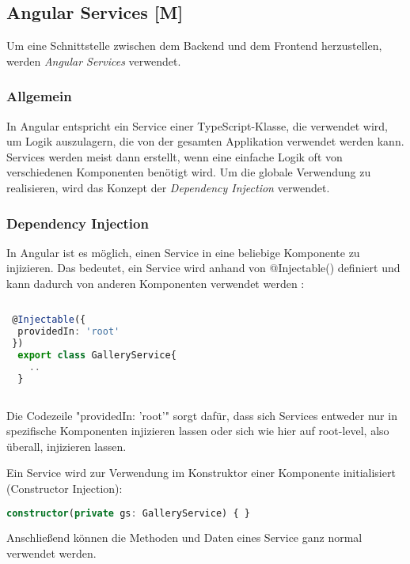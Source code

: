 \subsection{Angular Services [M]}

Um eine Schnittstelle zwischen dem Backend und dem Frontend herzustellen, werden \emph{Angular Services} verwendet.

\subsubsection{Allgemein}
In Angular entspricht ein Service einer TypeScript-Klasse, die verwendet wird, um Logik auszulagern, die von der gesamten Applikation verwendet werden kann. Services werden meist dann erstellt, wenn eine einfache Logik oft von verschiedenen Komponenten benötigt wird. Um die globale Verwendung zu realisieren, wird das Konzept der \emph{Dependency Injection} verwendet. \cite{AngularBuch} \cite{AngularArchitectureService}

\subsubsection{Dependency Injection}
\label{DPI}
In Angular ist es möglich, einen Service in eine beliebige Komponente zu injizieren. Das bedeutet, ein Service wird anhand von @Injectable() definiert und kann dadurch von anderen Komponenten verwendet werden \cite{AngularBuch}:

\begin{lstlisting}[caption={Eine Klasse Injectable machen},  language=TypeScript,label=lst:impl:injectable]   
    
 @Injectable({
  providedIn: 'root'
 })
  export class GalleryService{
    ..
  }
   
\end{lstlisting}

Die Codezeile "providedIn: 'root'" sorgt dafür, dass sich Services entweder nur in spezifische Komponenten injizieren lassen oder sich wie hier auf root-level, also überall, injizieren lassen. \cite{AngularBuch}

Ein Service wird zur Verwendung im Konstruktor einer Komponente initialisiert (Constructor Injection): 

\begin{lstlisting}[caption={Constructor Injection},  language=TypeScript,label=lst:impl:concstructorinjection]   
    constructor(private gs: GalleryService) { }
\end{lstlisting}
Anschließend können die Methoden und Daten eines Service ganz normal verwendet werden.

